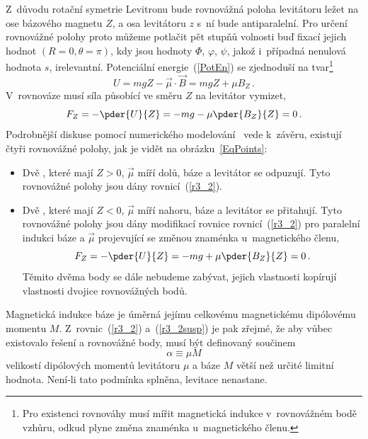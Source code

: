 Z~důvodu rotační symetrie Levitronu bude rovnovážná poloha levitátoru ležet na
ose bázového magnetu $Z$, a osa levitátoru $z$ s~ní bude antiparalelní. Pro
určení rovnovážné polohy proto můžeme potlačit pět stupňů volnosti buď fixací
jejich hodnot $(R=0,\theta=\pi)$, kdy jsou hodnoty $\Phi$, $\varphi$, $\psi$,
jakož i~případná nenulová hodnota $s$, irelevantní. Potenciální
energie~(\ref{PotEn}) se zjednoduší na tvar\footnote{Pro existenci rovnováhy
  musí mířit magnetická indukce v~rovnovážném bodě vzhůru, odkud plyne změna
  znaménka u~magnetického členu.}
\begin{equation}
  U = mgZ - \vec{\mu}\cdot\vec{B} = mgZ + \mu B_{Z}\,.              \label{r3_1}
\end{equation}
V~rovnováze musí síla působící ve směru $Z$ na levitátor vymizet,
\begin{equation}
  F_{Z}=-\pder{U}{Z}=-mg-\mu\pder{B_{Z}}{Z}=0\,.                     \label{r3_2}
\end{equation}
Podrobnější diskuse pomocí numerického
modelování~\cite{Hle:2011:SpinStabMagLev:WTC2011} vede k~závěru, existují
čtyři rovnovážné polohy, jak je vidět na obrázku~\ref{EqPoints}:
\begin{itemize}
\item Dvě , které mají $Z>0$, $\vec{\mu}$ míří dolů, báze a
  levitátor se odpuzují. Tyto rovnovážné polohy jsou dány
  rovnicí~(\ref{r3_2}).
\item Dvě , které mají $Z<0$, $\vec{\mu}$ míří nahoru, báze a
  levitátor se přitahují. Tyto rovnovážné polohy jsou dány modifikací rovnice
  rovnicí~(\ref{r3_2}) pro paralelní indukci báze a $\vec{\mu}$ projevující se
  změnou znaménka u~magnetického členu,
\begin{equation}
  F_{Z}=-\pder{U}{Z}=-mg+\mu\pder{B_{Z}}{Z}=0\,.                 \label{r3_2susp}
\end{equation}
 Těmito dvěma body se dále nebudeme zabývat, jejich vlastnosti kopírují
 vlastnosti  dvojice rovnovážných bodů.
\end{itemize}
Magnetická indukce báze je úměrná jejímu celkovému magnetickému
dipólovému momentu $M$. Z~rovnic~(\ref{r3_2}) a~(\ref{r3_2susp}) je
pak zřejmé, že aby vůbec existovalo řešení a rovnovážné body, musí být
 definovaný součinem
\begin{equation}
  \alpha \equiv \mu M                                          \label{BoundCoef}
\end{equation}
velikostí dipólových momentů levitátoru $\mu$ a báze $M$ větší než určité
limitní hodnota. Není-li tato podmínka splněna, levitace nenastane.

